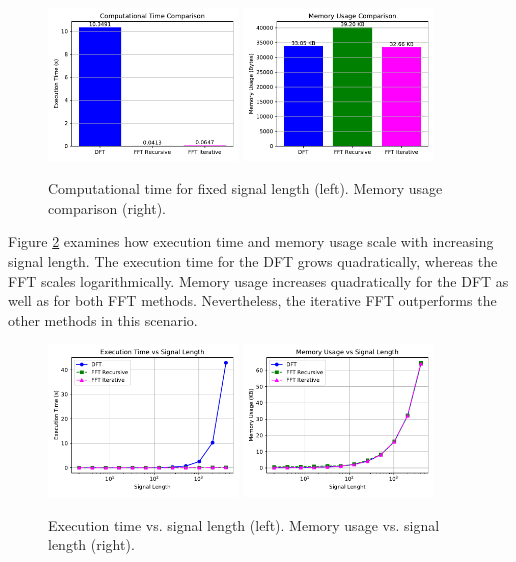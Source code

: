\documentclass[12pt, a4paper]{report}
\begin{document}
\begin{figure}[h!]
	\centering
	\includegraphics[width=0.45\textwidth]{figures/computional_time.pdf}
	\includegraphics[width=0.45\textwidth]{figures/memory_usage.pdf}
	\caption{Computational time for fixed signal length (left). Memory usage comparison (right).}
	\label{fig:time_memory_comparison}
\end{figure}

\noindent Figure \ref{fig:scaling_comparison} examines how execution time and memory usage scale with increasing signal length. The execution time for the \ac{DFT} grows quadratically, whereas the \ac{FFT} scales logarithmically. Memory usage increases quadratically for the \ac{DFT} as well as for both \ac{FFT} methods. Nevertheless, the iterative \ac{FFT} outperforms the other methods in this scenario.

\begin{figure}[h!]
	\centering
	\includegraphics[width=0.45\textwidth]{figures/computional_time_cmp.pdf}
	\includegraphics[width=0.45\textwidth]{figures/memory_usage_cmp.pdf}
	\caption{Execution time vs. signal length (left). Memory usage vs. signal length (right).}
	\label{fig:scaling_comparison}
\end{figure}
\end{document}
